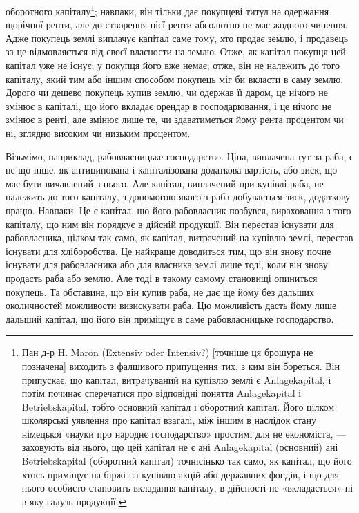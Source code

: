 \parcont{}  %
оборотного капіталу\footnote{
Пан д-р H. Maron (Extensiv oder Intensiv?) [точніше ця брошура не позначена] виходить з
фалшивого припущення тих, з ким він бореться. Він припускає, що капітал, витрачуваний на купівлю
землі є Anlagekapital, і потім починає сперечатися про відповідні поняття Anlagekapital і
Betriebskapital, тобто основний капітал і оборотний капітал. Його цілком школярські уявлення про
капітал взагалі, між іншим в наслідок стану німецької «науки про народнє господарство» простимі для
не економіста, — заховують від нього, що цей капітал не є ані Anlagekapital (основний) ані
Betriebskapital
(оборотний капітал) точнісінько так само, як капітал, що його хтось приміщує на біржі на купівлю
акцій або державних фондів, і що для нього особисто становить вкладання капіталу, в дійсності не
«вкладається» ні в яку галузь продукції.
}; навпаки, він тільки дає покупцеві титул на одержання
щорічної ренти, але до створення цієї ренти абсолютно не має жодного чинення.
Адже покупець землі виплачує капітал саме тому, хто продає землю, і продавець
за це відмовляється від своєї власности на землю. Отже, як капітал покупця
цей капітал уже не існує; у покупця його вже немає; отже, він не належить
до того капіталу, який тим або іншим способом покупець міг би вкласти
в саму землю. Дорого чи дешево покупець купив землю, чи одержав її даром,
це нічого не змінює в капіталі, що його вкладає орендар в господарювання, і
це нічого не змінює в ренті, але змінює лише те, чи здаватиметься йому рента
процентом чи ні, зглядно високим чи низьким процентом.

Візьмімо, наприклад, рабовласницьке господарство. Ціна, виплачена тут
за раба, є не що інше, як антиципована і капіталізована додаткова вартість,
або зиск, що має бути вичавлений з нього. Але капітал, виплачений при купівлі
раба, не належить до того капіталу, з допомогою якого з раба добувається
зиск, додаткову працю. Навпаки. Це є капітал, що його рабовласник позбувся,
вираховання з того капіталу, що ним він порядкує в дійсній продукції. Він
перестав існувати для рабовласника, цілком так само, як капітал, витрачений
на купівлю землі, перестав існувати для хліборобства. Це найкраще доводиться
тим, що він знову почне існувати для рабовласника або для власника землі
лише тоді, коли він знову продасть раба або землю. Але тоді в такому самому
становищі опиниться покупець. Та обставина, що він купив раба, не дає ще
йому без дальших околичностей можливости визискувати раба. Цю можливість
дасть йому лише дальший капітал, що його він приміщує в саме рабовласницьке
господарство.

